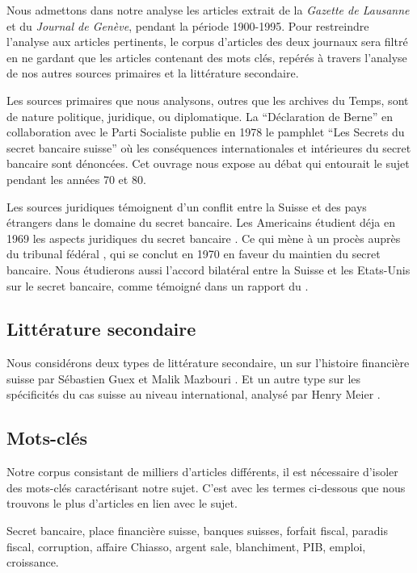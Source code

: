 \documentclass[11pt]{article}
\begin{document}
Nous admettons dans notre analyse les articles extrait de la \textit{Gazette de
Lausanne} et du \textit{Journal de Genève}, pendant la
période 1900-1995. Pour restreindre l’analyse aux articles pertinents, le corpus
d’articles des deux journaux sera filtré en ne gardant que les articles
contenant des mots clés, repérés à travers l’analyse de nos autres sources
primaires et la littérature secondaire.

Les sources primaires que nous analysons, outres que les archives du Temps, sont
de nature politique, juridique, ou diplomatique. La “Déclaration de Berne” en
collaboration avec le Parti Socialiste publie en 1978 le pamphlet “Les Secrets
du secret bancaire suisse” \citep{GiovanniniPierLuigi1978Lsds} où les
conséquences internationales et intérieures du secret bancaire sont dénoncées.
Cet ouvrage nous expose au débat qui entourait le sujet pendant les années 70 et
80.

Les sources juridiques témoignent d'un conflit entre la Suisse et des pays
étrangers dans le domaine du secret bancaire. Les Americains étudient déja en
1969 les aspects juridiques du secret bancaire \citep{Mueller69}. Ce qui mène à
un procès auprès du tribunal fédéral \citep{tribunalFederal70}, qui se conclut
en 1970 en faveur du maintien du secret bancaire. Nous étudierons aussi l'accord
bilatéral entre la Suisse et les Etats-Unis sur le secret bancaire, comme
témoigné dans un rapport du \citet{insiderTrading83}.

\subsection{Littérature secondaire}

Nous considérons deux types de littérature secondaire, un sur l’histoire financière
suisse par Sébastien Guex et Malik Mazbouri \citep{Guex99, Guex00, Mazbouri12}.
Et un autre type sur les spécificités du cas suisse au niveau international,
analysé par Henry Meier \citep{Meier12}.

\subsection{Mots-clés}

Notre corpus consistant de milliers d'articles différents, il est nécessaire
d'isoler des mots-clés caractérisant notre sujet. C'est avec les termes
ci-dessous que nous trouvons le plus d'articles en lien avec le sujet.

Secret bancaire, place financière suisse, banques suisses, forfait fiscal,
paradis fiscal, corruption, affaire Chiasso, argent sale, blanchiment, PIB,
emploi, croissance.
\end{document}

